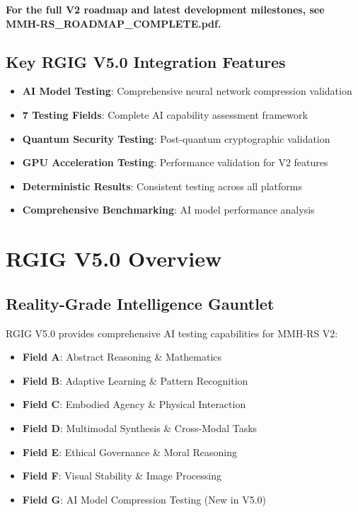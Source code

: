 \documentclass[12pt,a4paper]{article}
\begin{document}
\textbf{For the full V2 roadmap and latest development milestones, see MMH-RS\_ROADMAP\_COMPLETE.pdf.}

\subsection{Key RGIG V5.0 Integration Features}
\begin{itemize}
    \item \textbf{AI Model Testing}: Comprehensive neural network compression validation
    \item \textbf{7 Testing Fields}: Complete AI capability assessment framework
    \item \textbf{Quantum Security Testing}: Post-quantum cryptographic validation
    \item \textbf{GPU Acceleration Testing}: Performance validation for V2 features
    \item \textbf{Deterministic Results}: Consistent testing across all platforms
    \item \textbf{Comprehensive Benchmarking}: AI model performance analysis
\end{itemize}

\section{RGIG V5.0 Overview}

\subsection{Reality-Grade Intelligence Gauntlet}
RGIG V5.0 provides comprehensive AI testing capabilities for MMH-RS V2:

\begin{itemize}
    \item \textbf{Field A}: Abstract Reasoning \& Mathematics
    \item \textbf{Field B}: Adaptive Learning \& Pattern Recognition
    \item \textbf{Field C}: Embodied Agency \& Physical Interaction
    \item \textbf{Field D}: Multimodal Synthesis \& Cross-Modal Tasks
    \item \textbf{Field E}: Ethical Governance \& Moral Reasoning
    \item \textbf{Field F}: Visual Stability \& Image Processing
    \item \textbf{Field G}: AI Model Compression Testing (New in V5.0)
\end{itemize}
\end{document}
